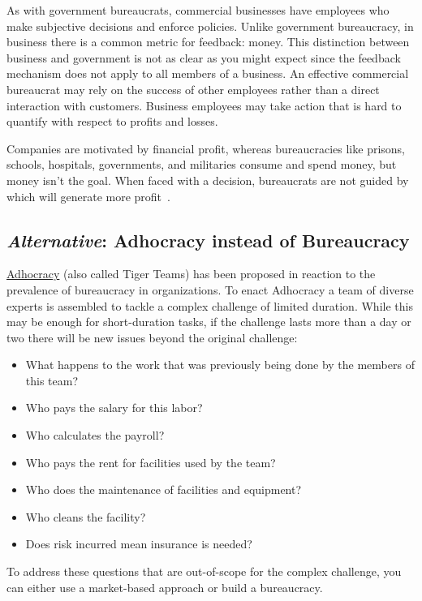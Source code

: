 As with government bureaucrats, commercial businesses have employees who make subjective decisions and enforce policies. Unlike government bureaucracy, in business there is a common metric for feedback: money. This distinction between business and government is not as clear as you might expect since the feedback mechanism does not apply to all members of a business. An effective commercial bureaucrat may rely on the success of other employees rather than a direct interaction with customers. Business employees may take action that is hard to quantify with respect to profits and losses.

Companies are motivated by financial profit, whereas bureaucracies like prisons, schools, hospitals, governments, and militaries  consume and spend money, but money isn't the goal. When faced with a decision, bureaucrats are not guided by which will generate more profit~\cite{2012_Wilson}.

\subsection*{\textit{Alternative}: Adhocracy instead of Bureaucracy}

\href{https://en.wikipedia.org/wiki/Adhocracy}{Adhocracy} 
%
\iftoggle{WPinmargin}{\marginpar{$>$Wikipedia: Adhocracy}}{}%
(also called Tiger Teams)
has been proposed in reaction to the prevalence of bureaucracy in organizations. To enact Adhocracy a team of diverse experts is assembled to tackle a complex challenge of limited duration.
While this may be enough for short-duration tasks, if the challenge lasts more than a day or two there will be new issues beyond the original challenge:

\begin{itemize}
    \item What happens to the work that was previously being done by the members of this team?
    \item Who pays the salary for this labor?
    \item Who calculates the payroll?
    \item Who pays the rent for facilities used by the team?
    \item Who does the maintenance of facilities and equipment?
    \item Who cleans the facility?
    \item Does risk incurred mean insurance is needed?
\end{itemize}
To address these questions that are out-of-scope for the complex challenge, you can either use a market-based approach or build a bureaucracy. 

